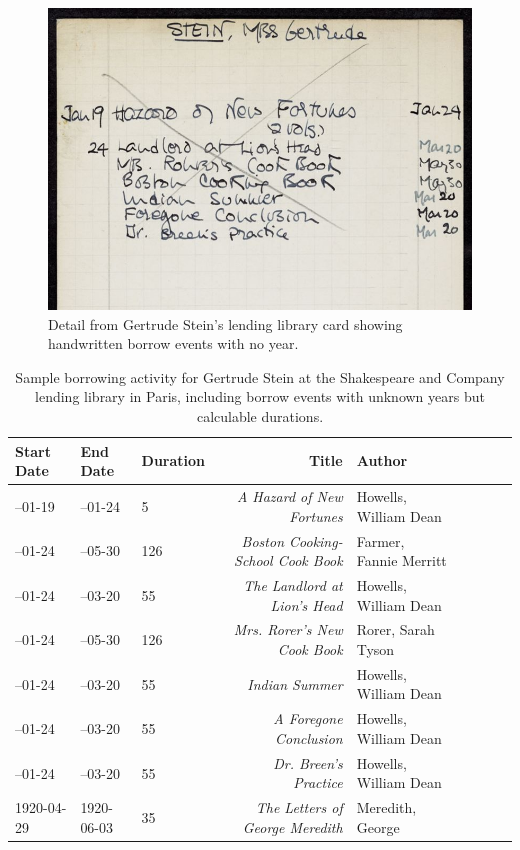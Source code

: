 \documentclass[final]{anthology-ch} %
\begin{document}
\begin{figure}[h]
  \centering
  \includegraphics[width=0.7\linewidth]{figures/stein_lendingcard_unknownyear.jpg}
  \caption{Detail from Gertrude Stein's lending library card showing handwritten borrow events with no year. \cite{stein_beachpapers_pul, noauthor_gertrude_nodate} }
  \label{fig:stein-lending-card}
\end{figure}


\begin{table}[h]
  \centering 
  \begin{tabular}{lllrllrrl}
    \toprule
    Start Date & End Date & Duration & Title & Author \\ 
    \midrule
--01-19 & --01-24 & 5 & \textit{A Hazard of New Fortunes} & Howells, William Dean \\
--01-24 & --05-30 & 126 & \textit{Boston Cooking-School Cook Book} & Farmer, Fannie Merritt \\
--01-24 & --03-20 & 55 & \textit{The Landlord at Lion's Head} & Howells, William Dean \\
--01-24 & --05-30 & 126 & \textit{Mrs. Rorer's New Cook Book} & Rorer, Sarah Tyson \\
--01-24 & --03-20 & 55 & \textit{Indian Summer} & Howells, William Dean \\
--01-24 & --03-20 & 55 & \textit{A Foregone Conclusion} & Howells, William Dean \\
--01-24 & --03-20 & 55 & \textit{Dr. Breen's Practice} & Howells, William Dean \\
1920-04-29 & 1920-06-03 & 35 & \textit{The Letters of George Meredith} & Meredith, George \\
    \bottomrule
  \end{tabular}
  \caption{Sample borrowing activity for Gertrude Stein at the Shakespeare and Company lending library in Paris, including borrow events with unknown years but calculable durations.}
  \label{tab:stein-borrowing}
\end{table}
\end{document}

